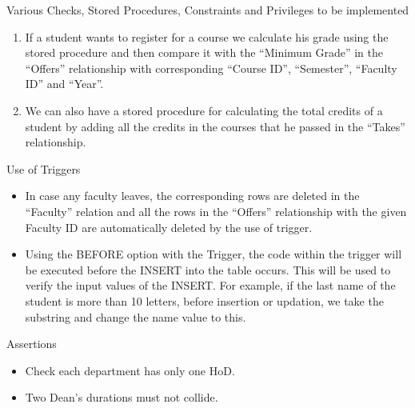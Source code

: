 \documentclass{beamer}
\begin{document}
\begin{frame}{Various Checks, Stored Procedures, Constraints and Privileges to be implemented}
\begin{enumerate}
\item If a student wants to register for a course we calculate his grade using the stored procedure and then compare it with the ``Minimum Grade'' in the ``Offers'' relationship with corresponding ``Course ID'', ``Semester'', ``Faculty ID'' and ``Year''.

\item We can also have a stored procedure for calculating the total credits of a student by adding all the credits in the courses that he passed in the ``Takes'' relationship.
\end{enumerate}
\end{frame}

\begin{frame}{Use of Triggers}
\begin{itemize}
\item In case any faculty leaves, the corresponding rows are deleted in the ``Faculty'' relation and all the rows in the ``Offers'' relationship with the given Faculty ID are automatically deleted by the use of trigger.
\item Using the BEFORE option with the Trigger, the code within the trigger will be executed before the INSERT into the table occurs. This will be used to verify the input values of the INSERT. For example, if the last name of the student is more than 10 letters, before insertion or updation, we take the substring and change the name value to this.

\end{itemize}
\end{frame}

\begin{frame}{Assertions}
\begin{itemize}
\item Check each department has only one HoD.
\item Two Dean's durations must not collide.

\end{itemize}
\end{frame}
\end{document}
